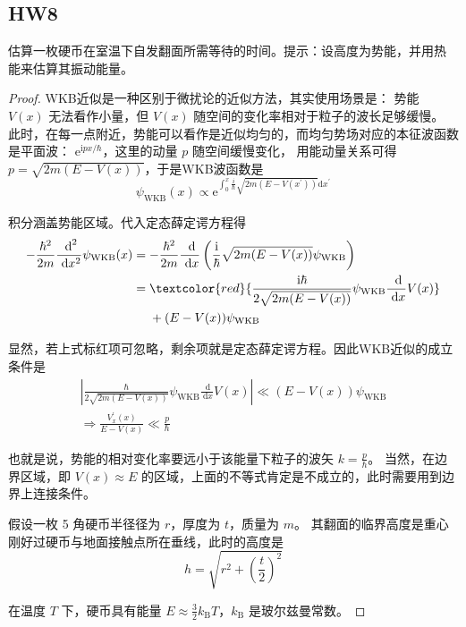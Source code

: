 \subsection{HW8}
\begin{1}
估算一枚硬币在室温下自发翻面所需等待的时间。提示：设高度为势能，并用热
能来估算其振动能量。
\end{1}
\begin{proof}
    WKB近似是一种区别于微扰论的近似方法，其实使用场景是：
    势能 $V(x)$ 无法看作小量，但 $V(x)$ 随空间的变化率相对于粒子的波长足够缓慢。
    此时，在每一点附近，势能可以看作是近似均匀的，而均匀势场对应的本征波函数是平面波：
    $\mathrm{e}^{\mathrm{i} p x / \hbar}$，这里的动量 $p$ 随空间缓慢变化，
    用能动量关系可得 $p=\sqrt{2 m(E-V(x))}$，于是WKB波函数是
$$\psi_{\text{WKB}}(x) \propto \mathrm{e}^{\int_{0}^{x} \frac{i}{\hbar} \sqrt{2m\left(E-V(x^{\prime})\right)} \mathrm{d} x^{\prime}}$$

积分涵盖势能区域。代入定态薛定谔方程得
$$\begin{aligned}
-\frac{\hbar^{2}}{2m} \frac{\mathrm{~d}^{2}}{\mathrm{~d} x^{2}} \psi_{\mathrm{WKB}}(x)&= -\frac{\hbar^{2}}{2m} \frac{\mathrm{~d}}{\mathrm{~d} x}\left(\frac{\mathrm{i}}{\hbar} \sqrt{2m(E-V(x))} \psi_{\mathrm{WKB}}\right) \\
&= \textcolor{red}{\frac{\mathrm{i} \hbar}{2 \sqrt{2m(E-V(x))}} \psi_{\mathrm{WKB}} \frac{\mathrm{~d}}{\mathrm{~d} x} V(x)} \\
& \quad\ +(E-V(x)) \psi_{\mathrm{WKB}}
\end{aligned}$$

显然，若上式标红项可忽略，剩余项就是定态薛定谔方程。因此WKB近似的成立条件是
$$
\begin{gathered}
\left|\frac{\hbar}{2 \sqrt{2 m(E-V(x))}} \psi_{\mathrm{WKB}} \frac{\mathrm{~d}}{\mathrm{~d} x} V(x)\right| 
\ll (E-V(x)) \psi_{\mathrm{WKB}} \\
\Rightarrow \frac{V_{x}^{\prime}(x)}{E-V(x)} \ll \frac{p}{\hbar}
\end{gathered}
$$

也就是说，势能的相对变化率要远小于该能量下粒子的波矢 $k=\frac{p}{\hbar}$。
当然，在边界区域，即 $V(x) \approx E$ 的区域，上面的不等式肯定是不成立的，此时需要用到边界上连接条件。

假设一枚 5 角硬币半径径为 $r$，厚度为 $t$，质量为 $m$。
其翻面的临界高度是重心刚好过硬币与地面接触点所在垂线，此时的高度是
$$h=\sqrt{r^{2}+\left(\frac{t}{2}\right)^{2}}$$

在温度 $T$ 下，硬币具有能量 $E \approx \frac{3}{2} k_{\mathrm{B}} T$，$k_{\mathrm{B}}$ 是玻尔兹曼常数。


\end{proof}
